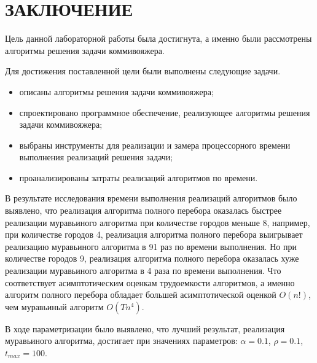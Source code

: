 \chapter*{ЗАКЛЮЧЕНИЕ}

Цель данной лабораторной работы была достигнута, а именно были рассмотрены алгоритмы решения задачи коммивояжера.

Для достижения поставленной цели были выполнены следующие задачи.
\begin{itemize}
	\item описаны алгоритмы решения задачи коммивояжера;
	\item спроектировано программное обеспечение, реализующее алгоритмы решения задачи коммивояжера;
	\item выбраны инструменты для реализации и замера процессорного времени
	выполнения реализаций решения задачи;
	\item проанализированы затраты реализаций алгоритмов по времени.
\end{itemize}

В результате исследования времени выполнения реализаций алгоритмов было выявлено, что реализация алгоритма полного перебора оказалась быстрее реализации муравьиного алгоритма при количестве городов меньше 8, например, при количестве городов 4, реализация алгоритма полного перебора выигрывает реализацию муравьиного алгоритма в 91 раз по времени выполнения. 
Но при количестве городов 9, реализация алгоритма полного перебора оказалась хуже реализации муравьиного алгоритма в 4 раза по времени выполнения.
Что соответствует асимптотическим оценкам трудоемкости алгоритмов, а именно алгоритм полного перебора обладает большей асимптотической оценкой $O(n!)$, чем муравьиный алгоритм $O(Tn^4)$.

В ходе параметризации было выявлено, что лучший результат, реализация муравьиного алгоритма, достигает при значениях параметров: $\alpha = 0.1$, $\rho = 0.1$, $t_{max} = 100$.